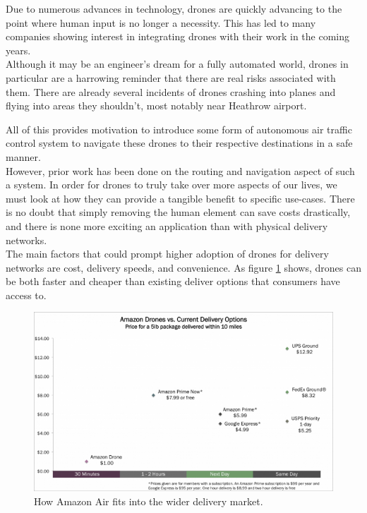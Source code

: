 \documentclass[a4paper,11pt,titlepage]{report}
\begin{document}
Due to numerous advances in technology, drones are quickly advancing to the point where human input is no longer a necessity. This has led to many companies showing interest in integrating drones with their work in the coming years. \\

Although it may be an engineer's dream for a fully automated world, drones in particular are a harrowing reminder that there are real risks associated with them. There are already several incidents of drones crashing into planes and flying into areas they shouldn't, most notably near Heathrow airport\cite{BBCNews2017}.

\clearpage
All of this provides motivation to introduce some form of autonomous air traffic control system to navigate these drones to their respective destinations in a safe manner.\\

However, prior work has been done on the routing and navigation aspect of such a system\cite{Balaji2017}. In order for drones to truly take over more aspects of our lives, we must look at how they can provide a tangible benefit to specific use-cases. There is no doubt that simply removing the human element can save costs drastically, and there is none more exciting an application than with physical delivery networks.\\

The main factors that could prompt higher adoption of drones for delivery networks are cost, delivery speeds, and convenience. As figure \ref{fig:drone_del_cost} shows, drones can be both faster and cheaper than existing deliver options that consumers have access to.
\begin{figure}[!hbpt]
  \center
  \includegraphics[width=\linewidth]{img/ark-invest-drones-analysis-768x460.png}
  \caption{How Amazon Air fits into the wider delivery market. \cite{Wang}}
  \label{fig:drone_del_cost}
\end{figure}
\end{document}
